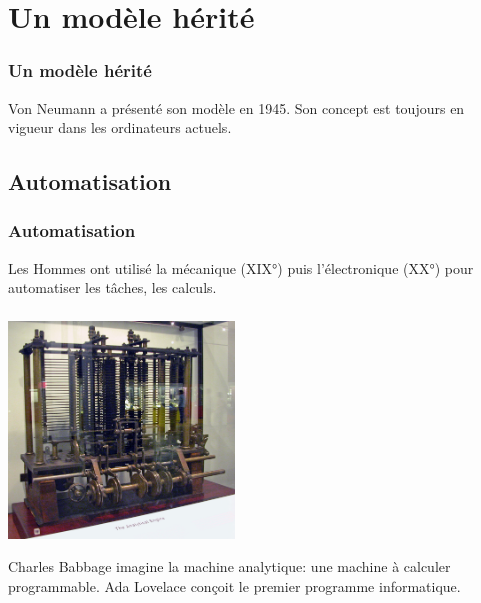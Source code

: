 \documentclass[svgnames,11pt]{beamer}
\begin{document}
\section{Un modèle hérité}
\begin{frame}
    \frametitle{Un modèle hérité}

\begin{aretenir}[]
    Von Neumann a présenté son modèle en 1945. Son concept est toujours en vigueur dans les ordinateurs actuels.

\end{aretenir}
\end{frame}
\subsection{Automatisation}
\begin{frame}
    \frametitle{Automatisation}

Les Hommes ont utilisé la mécanique (XIX°) puis l'électronique (XX°) pour automatiser les tâches, les calculs.

\end{frame}
\begin{frame}
    \frametitle{}

    \begin{center}
    \centering
    \includegraphics[width=6cm]{ressources/babbage.jpg}
    \end{center}
\begin{aretenir}[1834-1836]
    Charles Babbage imagine la machine analytique: une machine à calculer programmable. Ada Lovelace conçoit le premier programme informatique.
\end{aretenir}
\end{frame}
\end{document}
